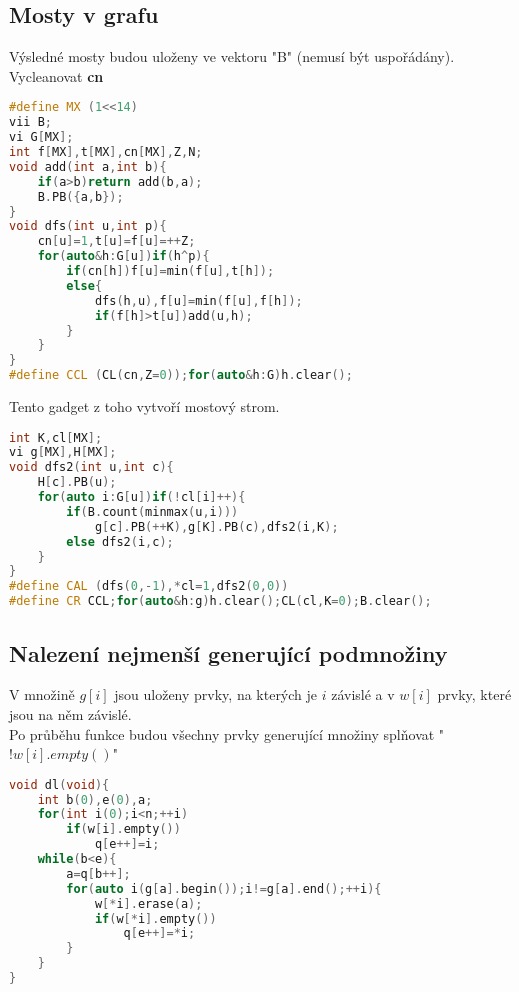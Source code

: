 \documentclass[11pt]{article}
\begin{document}
\subsection{Mosty v grafu}
Výsledné mosty budou uloženy ve vektoru "B" (nemusí být uspořádány).
\\Vycleanovat \textbf{cn}
\begin{lstlisting}[language=C++]
#define MX (1<<14)
vii B;
vi G[MX];
int f[MX],t[MX],cn[MX],Z,N;
void add(int a,int b){
    if(a>b)return add(b,a);
    B.PB({a,b});
}
void dfs(int u,int p){
    cn[u]=1,t[u]=f[u]=++Z;
    for(auto&h:G[u])if(h^p){
        if(cn[h])f[u]=min(f[u],t[h]);
        else{
            dfs(h,u),f[u]=min(f[u],f[h]);
            if(f[h]>t[u])add(u,h);
        }
    }
}
#define CCL (CL(cn,Z=0));for(auto&h:G)h.clear();
\end{lstlisting}
Tento gadget z toho vytvoří \textsf{mostový} strom.
\begin{lstlisting}[language=C++]
int K,cl[MX];
vi g[MX],H[MX];
void dfs2(int u,int c){
    H[c].PB(u);
    for(auto i:G[u])if(!cl[i]++){
        if(B.count(minmax(u,i)))
            g[c].PB(++K),g[K].PB(c),dfs2(i,K);
        else dfs2(i,c);
    }
}
#define CAL (dfs(0,-1),*cl=1,dfs2(0,0))
#define CR CCL;for(auto&h:g)h.clear();CL(cl,K=0);B.clear();
\end{lstlisting}
\subsection{Nalezení nejmenší generující podmnožiny}
V množině $g[i]$ jsou uloženy prvky, na kterých je $i$ závislé a v $w[i]$ prvky, které jsou na něm závislé.
\\Po průběhu funkce budou všechny prvky generující množiny splňovat "$!w[i].empty()$" 
\begin{lstlisting}[language=C++]
void dl(void){
    int b(0),e(0),a;
    for(int i(0);i<n;++i)
        if(w[i].empty())
            q[e++]=i;
    while(b<e){
        a=q[b++];
        for(auto i(g[a].begin());i!=g[a].end();++i){
            w[*i].erase(a);
            if(w[*i].empty())
                q[e++]=*i;
        }
    }
}
\end{lstlisting}
\end{document}
